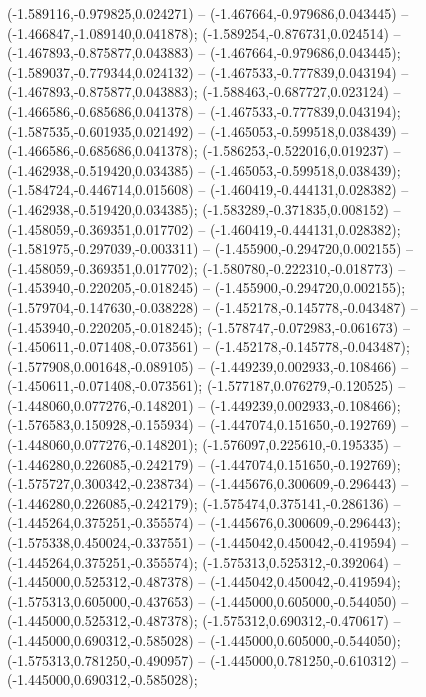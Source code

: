  (-1.589116,-0.979825,0.024271) -- (-1.467664,-0.979686,0.043445) -- (-1.466847,-1.089140,0.041878);
 (-1.589254,-0.876731,0.024514) -- (-1.467893,-0.875877,0.043883) -- (-1.467664,-0.979686,0.043445);
 (-1.589037,-0.779344,0.024132) -- (-1.467533,-0.777839,0.043194) -- (-1.467893,-0.875877,0.043883);
 (-1.588463,-0.687727,0.023124) -- (-1.466586,-0.685686,0.041378) -- (-1.467533,-0.777839,0.043194);
 (-1.587535,-0.601935,0.021492) -- (-1.465053,-0.599518,0.038439) -- (-1.466586,-0.685686,0.041378);
 (-1.586253,-0.522016,0.019237) -- (-1.462938,-0.519420,0.034385) -- (-1.465053,-0.599518,0.038439);
 (-1.584724,-0.446714,0.015608) -- (-1.460419,-0.444131,0.028382) -- (-1.462938,-0.519420,0.034385);
 (-1.583289,-0.371835,0.008152) -- (-1.458059,-0.369351,0.017702) -- (-1.460419,-0.444131,0.028382);
 (-1.581975,-0.297039,-0.003311) -- (-1.455900,-0.294720,0.002155) -- (-1.458059,-0.369351,0.017702);
 (-1.580780,-0.222310,-0.018773) -- (-1.453940,-0.220205,-0.018245) -- (-1.455900,-0.294720,0.002155);
 (-1.579704,-0.147630,-0.038228) -- (-1.452178,-0.145778,-0.043487) -- (-1.453940,-0.220205,-0.018245);
 (-1.578747,-0.072983,-0.061673) -- (-1.450611,-0.071408,-0.073561) -- (-1.452178,-0.145778,-0.043487);
 (-1.577908,0.001648,-0.089105) -- (-1.449239,0.002933,-0.108466) -- (-1.450611,-0.071408,-0.073561);
 (-1.577187,0.076279,-0.120525) -- (-1.448060,0.077276,-0.148201) -- (-1.449239,0.002933,-0.108466);
 (-1.576583,0.150928,-0.155934) -- (-1.447074,0.151650,-0.192769) -- (-1.448060,0.077276,-0.148201);
 (-1.576097,0.225610,-0.195335) -- (-1.446280,0.226085,-0.242179) -- (-1.447074,0.151650,-0.192769);
 (-1.575727,0.300342,-0.238734) -- (-1.445676,0.300609,-0.296443) -- (-1.446280,0.226085,-0.242179);
 (-1.575474,0.375141,-0.286136) -- (-1.445264,0.375251,-0.355574) -- (-1.445676,0.300609,-0.296443);
 (-1.575338,0.450024,-0.337551) -- (-1.445042,0.450042,-0.419594) -- (-1.445264,0.375251,-0.355574);
 (-1.575313,0.525312,-0.392064) -- (-1.445000,0.525312,-0.487378) -- (-1.445042,0.450042,-0.419594);
 (-1.575313,0.605000,-0.437653) -- (-1.445000,0.605000,-0.544050) -- (-1.445000,0.525312,-0.487378);
 (-1.575312,0.690312,-0.470617) -- (-1.445000,0.690312,-0.585028) -- (-1.445000,0.605000,-0.544050);
 (-1.575313,0.781250,-0.490957) -- (-1.445000,0.781250,-0.610312) -- (-1.445000,0.690312,-0.585028);
